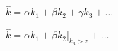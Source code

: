 
$\hat{k} = \alpha k_1 + \beta k_2 + \gamma k_3 + \dots$

\bigvspace

$\hat{k} = \alpha k_1 + \beta k_2 \Big|_{k_3 > z} + \dots$

